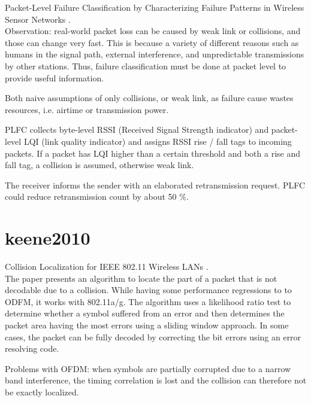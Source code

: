 Packet-Level Failure Classification by Characterizing Failure Patterns in Wireless Sensor Networks \cite{zhu2016}.\\

Observation: real-world packet loss can be caused by weak link or collisions, and those can change very fast. This is because a variety of different reasons such as humans in the signal path, external interference, and unpredictable transmissions by other stations. Thus, failure classification must be done at packet level to provide useful information.

Both naive assumptions of only collisions, or weak link, as failure cause wastes resources, i.e. airtime or transmission power.

PLFC collects byte-level RSSI (Received Signal Strength indicator) and packet-level LQI (link quality indicator) and assigns RSSI rise / fall tags to incoming packets. If a packet has LQI higher than a certain threshold and both a rise and fall tag, a collision is assumed, otherwise weak link.

The receiver informs the sender with an elaborated retransmission request. PLFC could reduce retransmission count by about 50 \%.



\section{keene2010}

Collision Localization for IEEE 802.11 Wireless LANs \cite{keene2010}.\\

The paper presents an algorithm to locate the part of a packet that is not decodable due to a collision. While having some performance regressions to to ODFM, it works with 802.11a/g. The algorithm uses a likelihood ratio test to determine whether a symbol suffered from an error and then determines the packet area having the most errors using a sliding window approach. In some cases, the packet can be fully decoded by correcting the bit errors using an error resolving code.

Problems with OFDM: when symbols are partially corrupted due to a narrow band interference, the timing correlation is lost and the collision can therefore not be exactly localized.




